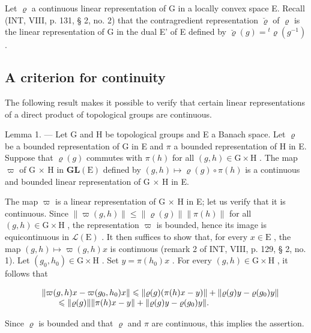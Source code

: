 Let \(\varrho\) a continuous linear representation of G in a locally convex space E. Recall (INT, VIII, p. 131, § 2, no. 2) that the contragredient representation \(\breve{\varrho}\) of \(\varrho\) is the linear representation of G in the dual E' of E defined by \(\breve{\varrho}(g) = {}^{t} \varrho(g^{-1})\) .

\subsection{A criterion for continuity}

The following result makes it possible to verify that certain linear representations of a direct product of topological groups are continuous.

Lemma 1. --- Let G and H be topological groups and E a Banach space. Let \(\varrho\) be a bounded representation of G in E and \(\pi\) a bounded representation of H in E. Suppose that \(\varrho(g)\) commutes with \(\pi(h)\) for all \((g,h)\in\mathrm{G}\times\mathrm{H}\) . The map \(\varpi\) of G \(\times\) H in \(\mathbf{GL}(\mathrm{E})\) defined by \((g,h)\mapsto\varrho(g)\circ\pi(h)\) is a continuous and bounded linear representation of G \(\times\) H in E.

The map \(\varpi\) is a linear representation of G × H in E; let us verify that it is continuous. Since \(\| \varpi(g, h) \| \leqslant \| \varrho(g) \| \| \pi(h) \|\) for all \((g, h) \in \mathrm{G} \times \mathrm{H}\) , the representation \(\varpi\) is bounded, hence its image is equicontinuous in \(\mathcal{L}(\mathrm{E})\) . It then suffices to show that, for every \(x \in \mathrm{E}\) , the map \((g, h) \mapsto \varpi(g, h)x\) is continuous (remark 2 of INT, VIII, p. 129, § 2, no. 1). Let \((g_0, h_0) \in \mathrm{G} \times \mathrm{H}\) . Set \(y = \pi(h_0)x\) . For every \((g, h) \in \mathrm{G} \times \mathrm{H}\) , it follows that

\[
\begin{array}{r l} & {\| \varpi (g, h) x - \varpi (g _ {0}, h _ {0}) x \| \leqslant \| \varrho (g) (\pi (h) x - y) \| + \| \varrho (g) y - \varrho (g _ {0}) y \|} \\ & {\qquad \leqslant \| \varrho (g) \| \| \pi (h) x - y \| + \| \varrho (g) y - \varrho (g _ {0}) y \|.} \end{array}
\]

Since \(\varrho\) is bounded and that \(\varrho\) and \(\pi\) are continuous, this implies the assertion.